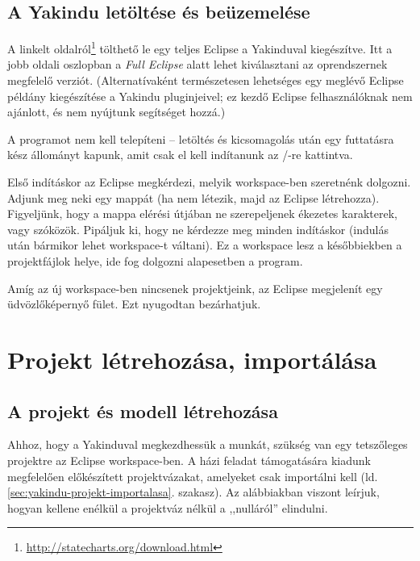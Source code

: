 \subsection{A Yakindu letöltése és beüzemelése}

A linkelt oldalról\footnote{\url{http://statecharts.org/download.html}} tölthető le egy teljes Eclipse a Yakinduval kiegészítve. Itt a jobb oldali oszlopban a \emph{Full Eclipse} alatt lehet kiválasztani az oprendszernek megfelelő verziót. (Alternatívaként természetesen lehetséges egy meglévő Eclipse példány kiegészítése a Yakindu pluginjeivel; ez kezdő Eclipse felhasználóknak nem ajánlott, és nem nyújtunk segítséget hozzá.)

A programot nem kell telepíteni -- letöltés és kicsomagolás után egy futtatásra kész állományt kapunk, amit csak el kell indítanunk az /-re kattintva.

Első indításkor az Eclipse megkérdezi, melyik workspace-ben szeretnénk dolgozni. Adjunk meg neki egy mappát (ha nem létezik, majd az Eclipse létrehozza). Figyeljünk, hogy a mappa elérési útjában ne szerepeljenek ékezetes karakterek, vagy szóközök. Pipáljuk ki, hogy ne kérdezze meg minden indításkor (indulás után bármikor lehet workspace-t váltani).
Ez a workspace lesz a későbbiekben a projektfájlok helye, ide fog dolgozni alapesetben a program.

\begin{comment}
Természetesen máshonnan is importálható projekt, illetve máshová is lehet menteni, de a workspace kényelmes megoldás arra, hogy egységes helyen tároljuk az aktuális munkáinkat.
\end{comment}

Amíg az új workspace-ben nincsenek projektjeink, az Eclipse megjelenít egy üdvözlőképernyő fület. Ezt nyugodtan bezárhatjuk.

\section{Projekt létrehozása, importálása}

\subsection{A projekt és modell létrehozása}
Ahhoz, hogy a Yakinduval megkezdhessük a munkát, szükség van egy tetszőleges projektre az Eclipse workspace-ben. A házi feladat támogatására kiadunk megfelelően előkészített projektvázakat, amelyeket csak importálni kell (ld. \ref{sec:yakindu-projekt-importalasa}. szakasz). Az alábbiakban viszont leírjuk, hogyan kellene enélkül a projektváz nélkül a ,,nulláról'' elindulni.

